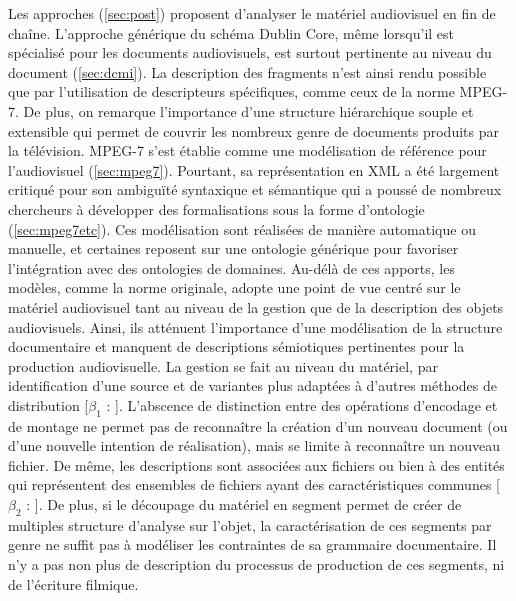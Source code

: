 Les approches  (\ref{sec:post}) proposent d'analyser le matériel audiovisuel en fin de chaîne. 
L'approche générique du schéma Dublin Core, même lorsqu'il est spécialisé pour les documents audiovisuels, est surtout pertinente au niveau du document (\ref{sec:dcmi}). 
La description des fragments n'est ainsi rendu possible que par l'utilisation de descripteurs spécifiques, comme ceux de la norme MPEG-7. 
De plus, on remarque l'importance d'une structure hiérarchique souple et extensible qui permet de couvrir les nombreux genre de documents produits par la télévision.
MPEG-7 s'est établie comme une modélisation de référence pour l'audiovisuel (\ref{sec:mpeg7}).
Pourtant, sa représentation en XML a été largement critiqué pour son ambiguïté syntaxique et sémantique qui a poussé de nombreux chercheurs à développer des formalisations sous la forme d'ontologie (\ref{sec:mpeg7etc}).
Ces modélisation sont réalisées de manière automatique ou manuelle, et certaines reposent sur une ontologie générique pour favoriser l'intégration avec des ontologies de domaines.
Au-délà de ces apports, les modèles, comme la norme originale, adopte une point de vue centré sur le matériel audiovisuel tant au niveau de la gestion que de la description des objets audiovisuels. 
Ainsi, ils atténuent l'importance d'une modélisation de la structure documentaire et manquent de descriptions sémiotiques pertinentes pour la production audiovisuelle.
La gestion se fait au niveau du matériel, par identification d'une source et de variantes plus adaptées à d'autres méthodes de distribution [$\beta_1$ : ].
L'abscence de distinction entre des opérations d'encodage et de montage ne permet pas de reconnaître la création d'un nouveau document (ou d'une nouvelle intention de réalisation), mais se limite à reconnaître un nouveau fichier.
De même, les descriptions sont associées aux fichiers ou bien à des entités qui représentent des ensembles de fichiers ayant des caractéristiques communes [$\beta_2$ : ]. 
De plus, si le découpage du matériel en segment permet de créer de multiples structure d'analyse sur l'objet, la caractérisation de ces segments par genre ne suffit pas à modéliser les contraintes de sa grammaire documentaire.
Il n'y a pas non plus de description du processus de production de ces segments, ni de l'écriture filmique.

